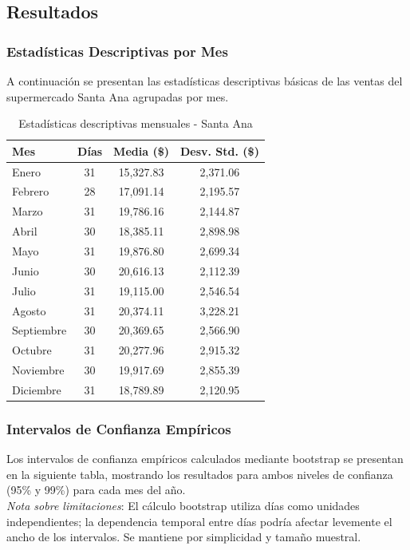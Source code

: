 \documentclass[11pt,a4paper]{article}
\begin{document}
\subsection{Resultados}

\subsubsection{Estadísticas Descriptivas por Mes}

A continuación se presentan las estadísticas descriptivas básicas de las ventas del supermercado Santa Ana agrupadas por mes.

\begin{table}[H]
\centering
\caption{Estadísticas descriptivas mensuales - Santa Ana}
\begin{tabular}{|l|c|c|c|}
\hline
\textbf{Mes} & \textbf{Días} & \textbf{Media (\$)} & \textbf{Desv. Std. (\$)} \\
\hline
Enero & 31 & 15,327.83 & 2,371.06 \\
Febrero & 28 & 17,091.14 & 2,195.57 \\
Marzo & 31 & 19,786.16 & 2,144.87 \\
Abril & 30 & 18,385.11 & 2,898.98 \\
Mayo & 31 & 19,876.80 & 2,699.34 \\
Junio & 30 & 20,616.13 & 2,112.39 \\
Julio & 31 & 19,115.00 & 2,546.54 \\
Agosto & 31 & 20,374.11 & 3,228.21 \\
Septiembre & 30 & 20,369.65 & 2,566.90 \\
Octubre & 31 & 20,277.96 & 2,915.32 \\
Noviembre & 30 & 19,917.69 & 2,855.39 \\
Diciembre & 31 & 18,789.89 & 2,120.95 \\
\hline
\end{tabular}
\end{table}

\subsubsection{Intervalos de Confianza Empíricos}

Los intervalos de confianza empíricos calculados mediante bootstrap se presentan en la siguiente tabla, mostrando los resultados para ambos niveles de confianza (95\% y 99\%) para cada mes del año.
\\
\textit{Nota sobre limitaciones}: El cálculo bootstrap utiliza días como unidades independientes; la dependencia temporal entre días podría afectar levemente el ancho de los intervalos. Se mantiene por simplicidad y tamaño muestral.
\end{document}
